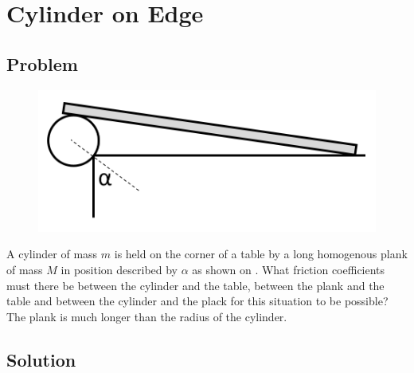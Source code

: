 \section*{Cylinder on Edge}

\subsection*{Problem}

\begin{figure}
    \centering
    \vspace{-.75cm}
    \includegraphics[width = \textwidth / 2]{P-1}
    \caption{}
    \vspace{-1cm}
\end{figure}

A cylinder of mass $m$ is held on the corner of a table
by a long homogenous plank of mass $M$
in position described by $\alpha$
as shown on .
What friction coefficients must there be
between the cylinder and the table,
between the plank and the table and
between the cylinder and the plack
for this situation to be possible?
The plank is much longer than the radius of the cylinder.

\subsection*{Solution}

